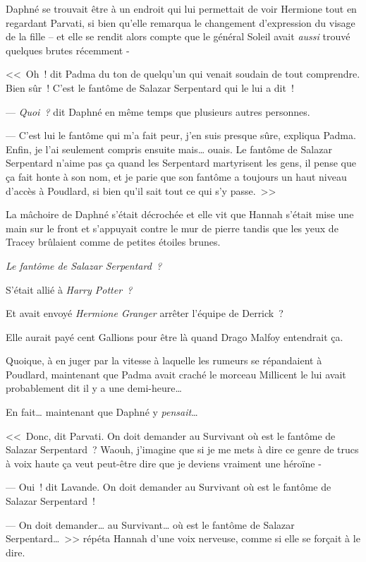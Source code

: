 Daphné se trouvait être à un endroit qui lui permettait de voir Hermione tout en regardant Parvati, si bien qu'elle remarqua le changement d'expression du visage de la fille -- et elle se rendit alors compte que le général Soleil avait \emph{aussi} trouvé quelques brutes récemment -

<<~Oh~! dit Padma du ton de quelqu'un qui venait soudain de tout comprendre. Bien sûr~! C'est le fantôme de Salazar Serpentard qui le lui a dit~!

--- \emph{Quoi~?} dit Daphné en même temps que plusieurs autres personnes.

--- C'est lui le fantôme qui m'a fait peur, j'en suis presque sûre, expliqua Padma. Enfin, je l'ai seulement compris ensuite mais… ouais. Le fantôme de Salazar Serpentard n'aime pas ça quand les Serpentard martyrisent les gens, il pense que ça fait honte à son nom, et je parie que son fantôme a toujours un haut niveau d'accès à Poudlard, si bien qu'il sait tout ce qui s'y passe.~>>

La mâchoire de Daphné s'était décrochée et elle vit que Hannah s'était mise une main sur le front et s'appuyait contre le mur de pierre tandis que les yeux de Tracey brûlaient comme de petites étoiles brunes.

\emph{Le fantôme de Salazar Serpentard~?}

S'était allié à \emph{Harry Potter~?}

Et avait envoyé \emph{Hermione Granger} arrêter l'équipe de Derrick~?

Elle aurait payé cent Gallions pour être là quand Drago Malfoy entendrait ça.

Quoique, à en juger par la vitesse à laquelle les rumeurs se répandaient à Poudlard, maintenant que Padma avait craché le morceau Millicent le lui avait probablement dit il y a une demi-heure…

En fait… maintenant que Daphné y \emph{pensait}…

<<~Donc, dit Parvati. On doit demander au Survivant où est le fantôme de Salazar Serpentard~? Waouh, j'imagine que si je me mets à dire ce genre de trucs à voix haute ça veut peut-être dire que je deviens vraiment une héroïne -

--- Oui~! dit Lavande. On doit demander au Survivant où est le fantôme de Salazar Serpentard~!

--- On doit demander… au Survivant… où est le fantôme de Salazar Serpentard…~>> répéta Hannah d'une voix nerveuse, comme si elle se forçait à le dire.

